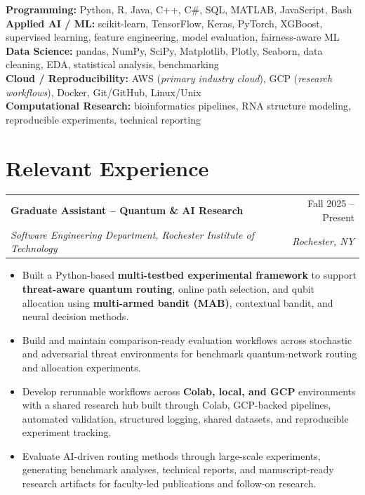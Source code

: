 \documentclass[10pt]{article}
\makeatletter
\newcommand{\resumeItem}[1]{\item\small{#1}}
\newcommand{\resumeSubheading}[4]{
  \vspace{4pt}
  \noindent
  \begin{tabular*}{\textwidth}[t]{@{}l@{\extracolsep{\fill}}r@{}}
    \textbf{#1} & #2 \\
    \textit{\small #3} & \textit{\small #4} \\
  \end{tabular*}\vspace{-4pt}
}
\makeatother
\begin{document}
\textbf{Programming:} Python, R, Java, C++, C\#, SQL, MATLAB, JavaScript, Bash \\
\textbf{Applied AI / ML:} scikit-learn, TensorFlow, Keras, PyTorch, XGBoost, supervised learning, feature engineering, model evaluation, fairness-aware ML \\
\textbf{Data Science:} pandas, NumPy, SciPy, Matplotlib, Plotly, Seaborn, data cleaning, EDA, statistical analysis, benchmarking \\
\textbf{Cloud / Reproducibility:} AWS (\textit{primary industry cloud}), GCP (\textit{research workflows}), Docker, Git/GitHub, Linux/Unix \\
\textbf{Computational Research:} bioinformatics pipelines, RNA structure modeling, reproducible experiments, technical reporting


\section{Relevant Experience}

\resumeSubheading
{Graduate Assistant -- Quantum \& AI Research}{Fall 2025 -- Present}
{Software Engineering Department, Rochester Institute of Technology}{Rochester, NY}
\begin{itemize}[leftmargin=1.2em]
\resumeItem{Built a Python-based \textbf{multi-testbed experimental framework} to support \textbf{threat-aware quantum routing}, online path selection, and qubit allocation using \textbf{multi-armed bandit (MAB)}, contextual bandit, and neural decision methods.}
\resumeItem{Build and maintain comparison-ready evaluation workflows across stochastic and adversarial threat environments for benchmark quantum-network routing and allocation experiments.}
\resumeItem{Develop rerunnable workflows across \textbf{Colab, local, and GCP} environments with a shared research hub built through Colab, GCP-backed pipelines, automated validation, structured logging, shared datasets, and reproducible experiment tracking.}
\resumeItem{Evaluate AI-driven routing methods through large-scale experiments, generating benchmark analyses, technical reports, and manuscript-ready research artifacts for faculty-led publications and follow-on research.}
\end{itemize}
\end{document}
